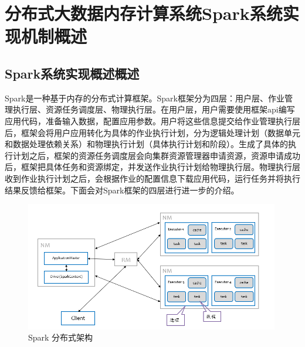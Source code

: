 \chapter{分布式大数据内存计算系统Spark系统实现机制概述}\label{chap:basic}
\section{Spark系统实现概述概述}
Spark是一种基于内存的分布式计算框架。Spark框架分为四层：用户层、作业管理执行层、资源任务调度层、物理执行层。在用户层，用户需要使用框架api编写应用代码，准备输入数据，配置应用参数。用户将这些信息提交给作业管理执行层后，框架会将用户应用转化为具体的作业执行计划，分为逻辑处理计划（数据单元和数据处理依赖关系）和物理执行计划（具体执行计划和阶段）。生成了具体的执行计划之后，框架的资源任务调度层会向集群资源管理器申请资源，资源申请成功后，框架把具体任务和资源绑定，并发送作业执行计划给物理执行层。物理执行层收到作业执行计划之后，会根据作业的配置信息下载应用代码，运行任务并将执行结果反馈给框架。下面会对Spark框架的四层进行进一步的介绍。

\begin{figure}[htbp]
    \centering
    \includegraphics[width=0.99\textwidth]{Img/spark-distribution-framework.png}
    \caption{Spark 分布式架构}
    \label{fig:spark-framework}
\end{figure}

